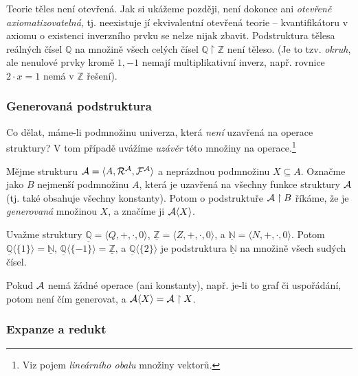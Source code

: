 \begin{example}
    Teorie těles není otevřená. Jak si ukážeme později, není dokonce ani \emph{otevřeně axiomatizovatelná}, tj. neexistuje jí ekvivalentní otevřená teorie -- kvantifikátoru v axiomu o existenci inverzního prvku se nelze nijak zbavit. Podstruktura tělesa reálných čísel $\mathbb Q$ na množině všech celých čísel $\mathbb Q\restriction\mathbb Z$ není těleso. (Je to tzv. \emph{okruh}, ale nenulové prvky kromě $1,-1$ nemají multiplikativní inverz, např. rovnice $2\cdot x=1$ nemá v $\mathbb Z$ řešení).
\end{example}

\subsubsection{Generovaná podstruktura}

Co dělat, máme-li podmnožinu univerza, která \emph{není} uzavřená na operace struktury? V tom případě uvážíme \emph{uzávěr} této množiny na operace.\footnote{Viz pojem \emph{lineárního obalu} množiny vektorů.}

\begin{definition}
    Mějme strukturu $\mathcal{A}=\langle A,\mathcal R^\mathcal A,\mathcal F^\mathcal A\rangle$ a neprázdnou podmnožinu $X\subseteq A$. Označme jako $B$ nejmenší podmnožinu $A$, která je uzavřená na všechny funkce struktury $\mathcal{A}$ (tj. také obsahuje všechny konstanty). Potom o podstruktuře $\mathcal{A}\restriction B$ říkáme, že je \emph{generovaná} množinou $X$, a značíme ji $\mathcal{A}\langle X\rangle$.
\end{definition}

\begin{example}
    Uvažme struktury $\underline{\mathbb Q}=\langle Q,+,\cdot,0\rangle$, $\underline{\mathbb Z}=\langle Z,+,\cdot,0\rangle$, a $\underline{\mathbb N}=\langle N,+,\cdot,0\rangle$. Potom $\underline{\mathbb Q}\langle\{1\}\rangle=\underline{\mathbb N}$, $\underline{\mathbb Q}\langle\{-1\}\rangle=\underline{\mathbb Z}$, a $\underline{\mathbb Q}\langle\{2\}\rangle$ je podstruktura $\underline{\mathbb N}$ na množině všech sudých čísel.
\end{example}

\begin{example}
    Pokud $\mathcal{A}$ nemá žádné operace (ani konstanty), např. je-li to graf či uspořádání, potom není čím generovat, a $\mathcal{A}\langle X\rangle=\mathcal{A}\restriction X$.
\end{example}

\subsubsection{Expanze a redukt}

